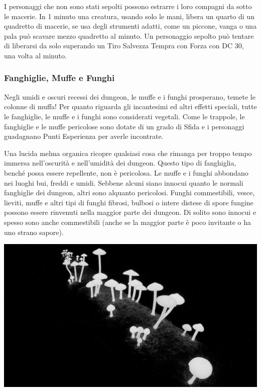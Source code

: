 \begin{multicols}{2}
I personaggi che non sono stati sepolti possono estrarre i loro compagni da sotto le macerie. In 1 minuto una creatura, usando solo le mani, libera un quarto di un quadretto di macerie, se usa degli strumenti adatti, come un piccone, vanga o una pala può scavare mezzo quadretto al minuto. Un personaggio sepolto può tentare di liberarsi da solo superando un Tiro Salvezza Tempra con Forza con DC 30, una volta al minuto.

\subsubsection{Fanghiglie, Muffe e Funghi}

Negli umidi e oscuri recessi dei dungeon, le muffe e i funghi prosperano, temete le colonne di muffa! Per quanto riguarda gli incantesimi ed altri effetti speciali, tutte le fanghiglie, le muffe e i funghi sono considerati vegetali. Come le trappole, le fanghiglie e le muffe pericolose sono dotate di un grado di Sfida e i personaggi guadagnano Punti Esperienza per averle incontrate.

Una lucida melma organica ricopre qualsiasi cosa che rimanga per troppo tempo immersa nell'oscurità e nell'umidità dei dungeon. Questo tipo di fanghiglia, benché possa essere repellente, non è pericolosa. Le muffe e i funghi abbondano nei luoghi bui, freddi e umidi. Sebbene alcuni siano innocui quanto le normali fanghiglie dei dungeon, altri sono alquanto pericolosi. Funghi commestibili, vesce, lieviti, muffe e altri tipi di funghi fibrosi, bulbosi o intere distese di spore fungine possono essere rinvenuti nella maggior parte dei dungeon. Di solito sono innocui e spesso sono anche commestibili (anche se la maggior parte è poco invitante o ha uno strano sapore).

\begin{center}
	\includegraphics[width=0.95\linewidth]{immagini/funghi.png}


\end{center}
\end{multicols}

